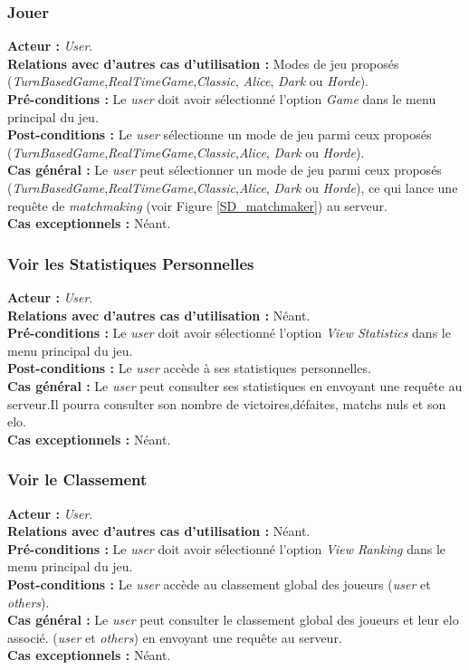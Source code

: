 \documentclass[10pt, a4paper]{article}
\begin{document}
\subsubsection{Jouer}
\textbf{Acteur :} \textit{User}.\\
\textbf{Relations avec d'autres cas d'utilisation :} Modes de jeu proposés (\textit{TurnBasedGame},\textit{RealTimeGame},\textit{Classic}, \textit{Alice}, \textit{Dark} ou \textit{Horde}).\\
\textbf{Pré-conditions :} Le \textit{user} doit avoir sélectionné l'option \textit{Game} dans le menu principal du jeu.\\
\textbf{Post-conditions :} Le  \textit{user} sélectionne un mode de jeu parmi ceux proposés (\textit{TurnBasedGame},\textit{RealTimeGame},\textit{Classic},\textit{Alice}, \textit{Dark} ou \textit{Horde}).\\
\textbf{Cas général :} Le  \textit{user} peut sélectionner un mode de jeu parmi ceux proposés (\textit{TurnBasedGame},\textit{RealTimeGame},\textit{Classic},\textit{Alice}, \textit{Dark} ou \textit{Horde}), ce qui lance une requête de \textit{matchmaking} (voir Figure \ref{SD_matchmaker}) au serveur.\\
\textbf{Cas exceptionnels :} Néant.



\subsubsection{Voir les Statistiques Personnelles}
\textbf{Acteur :} \textit{User}.\\
\textbf{Relations avec d'autres cas d'utilisation :} Néant.\\
\textbf{Pré-conditions :} Le \textit{user} doit avoir sélectionné l'option \textit{View Statistics} dans le menu principal du jeu.\\
\textbf{Post-conditions :} Le \textit{user} accède à ses statistiques personnelles.\\
\textbf{Cas général :} Le \textit{user} peut consulter ses statistiques en envoyant une requête au serveur.Il pourra consulter son nombre de victoires,défaites, matchs nuls et son elo.\\
\textbf{Cas exceptionnels :} Néant.

\subsubsection{Voir le Classement}
\textbf{Acteur :} \textit{User}.\\
\textbf{Relations avec d'autres cas d'utilisation :} Néant.\\
\textbf{Pré-conditions :} Le \textit{user} doit avoir sélectionné l'option \textit{View Ranking} dans le menu principal du jeu.\\
\textbf{Post-conditions :} Le \textit{user} accède au classement global des joueurs (\textit{user} et \textit{others}).\\
\textbf{Cas général :} Le \textit{user} peut consulter le classement global des joueurs et leur elo associé. (\textit{user} et \textit{others}) en envoyant une requête au serveur.\\
\textbf{Cas exceptionnels :} Néant.
\end{document}
